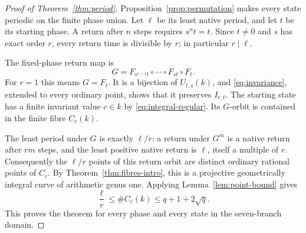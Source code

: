 \begin{proof}[Proof of Theorem~\ref{thm:period}]
Proposition~\ref{prop:permutation} makes every state periodic on
the finite phase union. Let \(\ell\) be its least native period,
and let \(t\) be its starting phase. A return after \(n\) steps
requires \(s^nt=t\). Since \(t\ne0\) and \(s\) has exact
order \(r\), every return time is divisible by \(r\); in
particular \(r\mid\ell\).

The fixed-phase return map is
\[
G=F_{s^{r-1}t}\circ\cdots\circ F_{st}\circ F_t.
\]
For \(r=1\) this means \(G=F_t\). It is a bijection of
\(U_{t,s}(k)\), and \eqref{eq:invariance}, extended to every
ordinary point, shows that it preserves \(I_{r,t}\).
The starting state has a finite invariant value \(c\in k\) by
\eqref{eq:integral-regular}. Its \(G\)-orbit is contained in the
finite fibre \(C_c(k)\).

The least period under \(G\) is exactly \(\ell/r\): a return
under \(G^m\) is a native return after \(rm\) steps, and the
least positive native return is \(\ell\), itself a multiple of
\(r\). Consequently the \(\ell/r\) points of this return
orbit are distinct ordinary rational points of \(C_c\).
By Theorem~\ref{thm:fibres-intro}, this is a projective
geometrically integral curve of arithmetic genus one. Applying
Lemma~\ref{lem:point-bound} gives
\[
\frac{\ell}{r}\le\#C_c(k)\le q+1+2\sqrt q.
\]
This proves the theorem for every phase and every state in the
seven-branch domain.
\end{proof}
